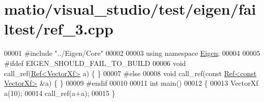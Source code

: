 \hypertarget{matio_2visual__studio_2test_2eigen_2failtest_2ref__3_8cpp_source}{}\section{matio/visual\+\_\+studio/test/eigen/failtest/ref\+\_\+3.cpp}
\label{matio_2visual__studio_2test_2eigen_2failtest_2ref__3_8cpp_source}

\begin{DoxyCode}
00001 \textcolor{preprocessor}{#include "../Eigen/Core"}
00002 
00003 \textcolor{keyword}{using namespace }\hyperlink{namespace_eigen}{Eigen};
00004 
00005 \textcolor{preprocessor}{#ifdef EIGEN\_SHOULD\_FAIL\_TO\_BUILD}
00006 \textcolor{keywordtype}{void} call\_ref(\hyperlink{group___core___module_class_eigen_1_1_ref}{Ref<VectorXf>} a) \{ \}
00007 \textcolor{preprocessor}{#else}
00008 \textcolor{keywordtype}{void} call\_ref(\textcolor{keyword}{const} \hyperlink{group___core___module_class_eigen_1_1_ref}{Ref<const VectorXf>} &a) \{ \}
00009 \textcolor{preprocessor}{#endif}
00010 
00011 \textcolor{keywordtype}{int} main()
00012 \{
00013   VectorXf a(10);
00014   call\_ref(a+a);
00015 \}
\end{DoxyCode}
